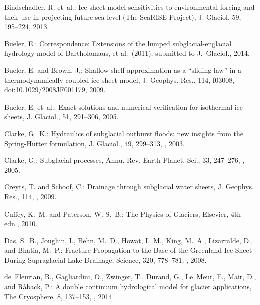 \documentclass[gmd]{copernicus}   %
\begin{document}
\begin{thebibliography}{67}
Bindschadler, R. et~al.: Ice-sheet model sensitivities to environmental forcing
  and their use in projecting future sea-level ({T}he {S}ea{RISE} {P}roject),
  J. Glaciol, 59, 195--224, 2013.

Bueler, E.: Correspondence: Extensions of the lumped subglacial-englacial
  hydrology model of {B}artholomaus, et al.~(2011), submitted to J.~Glaciol.,
  2014.

Bueler, E. and Brown, J.: Shallow shelf approximation as a ``sliding law'' in a
  thermodynamically coupled ice sheet model, J. Geophys. Res., 114, f03008,
  doi:10.1029/2008JF001179, 2009.

Bueler, E. et~al.: Exact solutions and numerical verification for isothermal ice sheets,
  J. Glaciol., 51, 291--306, 2005.

Clarke, G.~K.: Hydraulics of subglacial outburst floods: new insights from the
  {Spring-Hutter} formulation, J. Glaciol., 49, 299--313,
  , 2003.

Clarke, G.: Subglacial processes, Annu. Rev. Earth Planet. Sci., 33,
  247--276, , 2005.

Creyts, T. and Schoof, C.: Drainage through subglacial water sheets, J.
  Geophys. Res., 114, , 2009.

Cuffey, K.~M. and Paterson, W. S.~B.: The {P}hysics of {G}laciers, Elsevier,
  4th edn., 2010.

Das, S.~B., Joughin, I., Behn, M.~D., Howat, I.~M., King, M.~A., Lizarralde,
  D., and Bhatia, M.~P.: {Fracture Propagation to the Base of the Greenland Ice
  Sheet During Supraglacial Lake Drainage}, Science, 320, 778--781,
  , 2008.

de~Fleurian, B., Gagliardini, O., Zwinger, T., Durand, G., Le~Meur, E., Mair,
  D., and R{\aa}back, P.: A double continuum hydrological model for glacier
  applications, The Cryosphere, 8, 137--153, , 2014.


\end{thebibliography}
\end{document}

